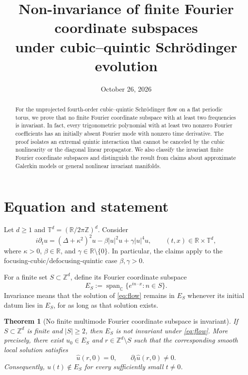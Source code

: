 \documentclass[11pt]{amsart}
\title[Non-invariance of finite Fourier coordinate subspaces]
{Non-invariance of finite Fourier coordinate subspaces\\
under cubic--quintic Schr\"odinger evolution}
\date{October 26, 2026}
\newtheorem{theorem}{Theorem}
\newcommand{\T}{\mathbb T}
\newcommand{\Z}{\mathbb Z}
\newcommand{\R}{\mathbb R}
\newcommand{\C}{\mathbb C}
\newcommand{\Span}{\operatorname{span}}
\begin{document}
\begin{abstract}
For the unprojected fourth-order cubic--quintic Schr\"odinger flow on a flat
periodic torus, we prove that no finite Fourier coordinate subspace with at
least two frequencies is invariant.  In fact, every trigonometric polynomial
with at least two nonzero Fourier coefficients has an initially absent Fourier
mode with nonzero time derivative.  The proof isolates an extremal quintic
interaction that cannot be canceled by the cubic nonlinearity or the diagonal
linear propagator.  We also classify the invariant finite Fourier coordinate
subspaces and distinguish the result from claims about approximate Galerkin
models or general nonlinear invariant manifolds.
\end{abstract}
\maketitle

\section{Equation and statement}

Let $d\ge 1$ and $\T^d=(\R/2\pi\Z)^d$.  Consider
\begin{equation}\label{eq:flow}
 i\partial_t u=(\Delta+\kappa^2)^2u-\beta|u|^2u+\gamma|u|^4u,
 \qquad (t,x)\in\R\times\T^d,
\end{equation}
where $\kappa>0$, $\beta\in\R$, and $\gamma\in\R\setminus\{0\}$.
In particular, the claims apply to the focusing-cubic/defocusing-quintic
case $\beta,\gamma>0$.

For a finite set $S\subset\Z^d$, define its Fourier coordinate subspace
\begin{equation}\label{eq:ES}
 E_S:=\Span_{\C}\{e^{in\cdot x}:n\in S\}.
\end{equation}
Invariance means that the solution of \eqref{eq:flow} remains in $E_S$
whenever its initial datum lies in $E_S$, for as long as that solution exists.

\begin{theorem}[No finite multimode Fourier coordinate subspace is invariant]
\label{thm:noninvariance}
If $S\subset\Z^d$ is finite and $|S|\ge 2$, then $E_S$ is not
invariant under \eqref{eq:flow}.  More precisely, there exist
$u_0\in E_S$ and $r\in\Z^d\setminus S$ such that the corresponding
smooth local solution satisfies
\begin{equation}\label{eq:derivative-nonzero}
 \widehat u(r,0)=0,
 \qquad \partial_t\widehat u(r,0)\ne 0.
\end{equation}
Consequently, $u(t)\notin E_S$ for every sufficiently small $t\ne0$.
\end{theorem}
\end{document}
